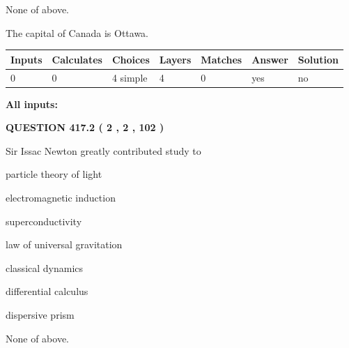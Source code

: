 \documentclass[12pt]{article}
\begin{document}
 
 None of above.
 
 
\noindent{}
 
 
The capital of Canada is Ottawa.
 
 
\noindent{}
 
 
   
   
   
   
\noindent\begin{tabular}{|l|l|l|l|l|l|l|}
 \hline
Inputs & Calculates & Choices & Layers & Matches & Answer & Solution \\ \hline
 0  & 
 0  & 
 4
  simple  
  & 
 4  & 
 0  & 
  yes & 
  no 
  \\ \hline
 \end{tabular}
   
   
   
   
\noindent{}
   
   
   
   
\noindent\vspace{0.1in}\hspace{-0.08in} {\textbf{\Large{All inputs: }}}
   
   
  
\vspace{0.2in}
  
{\textbf{\Large{QUESTION
417.2 
 ( 2 , 2 , 102 )
}}}
  
  
Sir Issac Newton greatly contributed study to
 
 
particle theory of light
 
 
electromagnetic induction
 
 
superconductivity
 
 
law of universal gravitation
 
 
classical dynamics
 
 
differential calculus
 
 
dispersive prism
 
 
 None of above.
 
\end{document}
